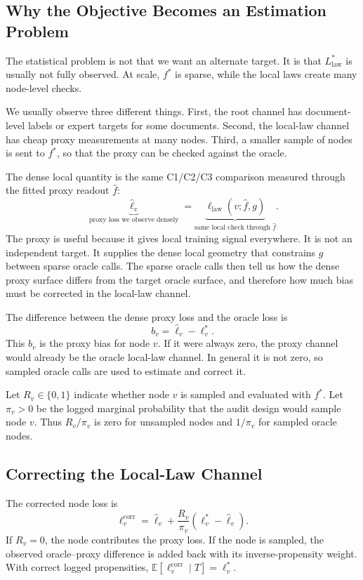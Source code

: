 \subsection{Why the Objective Becomes an Estimation Problem}

The statistical problem is not that we want an alternate target. It is that
\(L_{\mathrm{law}}^\ast\) is usually not fully observed. At scale, \(f^\ast\)
is sparse, while the local laws create many node-level checks.

We usually observe three different things. First, the root channel has
document-level labels or expert targets for some documents. Second, the
local-law channel has cheap proxy measurements at many nodes. Third, a smaller
sample of nodes is sent to \(f^\ast\), so that the proxy can be checked against
the oracle.

The dense local quantity is the same C1/C2/C3 comparison measured through the
fitted proxy readout \(\widehat f\):
\[
  \underbrace{\widehat\ell_v}_{\text{proxy loss we observe densely}}
  =
  \underbrace{\ell_{\mathrm{law}}(v;\widehat f,g)}_{\text{same local check through }\widehat f}.
\]
The proxy is useful because it gives local training signal everywhere. It is
not an independent target. It supplies the dense local geometry that constrains
\(g\) between sparse oracle calls. The sparse oracle calls then tell us how
the dense proxy surface differs from the target oracle surface, and therefore
how much bias must be corrected in the local-law channel.

The difference between the dense proxy loss and the oracle loss is
\[
  b_v=\widehat\ell_v-\ell_v^\ast .
\]
This \(b_v\) is the proxy bias for node \(v\). If it were always zero, the
proxy channel would already be the oracle local-law channel. In general it is
not zero, so sampled oracle calls are used to estimate and correct it.

Let \(R_v\in\{0,1\}\) indicate whether node \(v\) is sampled and evaluated
with \(f^\ast\). Let \(\pi_v>0\) be the logged marginal probability that the
audit design would sample node \(v\). Thus \(R_v/\pi_v\) is zero for unsampled
nodes and \(1/\pi_v\) for sampled oracle nodes.

\subsection{Correcting the Local-Law Channel}

The corrected node loss is
\begin{equation}
\label{eq:v8-corrected-node-loss}
  \ell_v^{\mathrm{corr}}
  =
  \widehat\ell_v
  +
  \frac{R_v}{\pi_v}
  \left(\ell_v^\ast-\widehat\ell_v\right).
\end{equation}
If \(R_v=0\), the node contributes the proxy loss. If the node is sampled, the
observed oracle--proxy difference is added back with its inverse-propensity
weight. With correct logged propensities,
\(\mathbb E[\ell_v^{\mathrm{corr}}\mid T]=\ell_v^\ast\).

